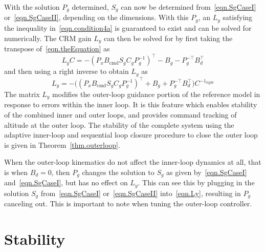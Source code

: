 With the solution $P_{g}$ determined, $S_{g}$ can now be determined from\ \eqref{eqn.SgCaseI} or\ \eqref{eqn.SgCaseII}, depending on the dimensions.
With this $P_{g}$, an $L_{g}$ satisfying the inequality in\ \eqref{eqn.condition4a} is guaranteed to exist and can be solved for numerically.
The CRM gain $L_{y}$ can then be solved for by first taking the transpose of\ \eqref{eqn.theEquation} as
\begin{equation*}
  L_{y}C=
  - (P_{x}B_{\text{cmd}}S_{g}C_{g}P_{g}^{-1})^{\top} - B_{g} - P_{g}^{-\top}B_{d}^{\top}
\end{equation*}
and then using a right inverse to obtain $L_{y}$ as
\begin{equation}
  \label{eqn.Ly}
  L_{y}=
  -\bigr((P_{x}B_{\text{cmd}}S_{g}C_{g}P_{g}^{-1})^{\top} + B_{g} + P_{g}^{-\top}B_{d}^{\top}\bigr)C^{-1_{\text{right}}}
\end{equation}
The matrix $L_{y}$ modifies the outer-loop guidance portion of the reference model in response to errors within the inner loop.
It is this feature which enables stability of the combined inner and outer loops, and provides command tracking of altitude at the outer loop.
The stability of the complete system using the adaptive inner-loop and sequential loop closure procedure to close the outer loop is given in Theorem~\ref{thm.outerloop}.

\begin{rem-dan}
  When the outer-loop kinematics do not affect the inner-loop dynamics at all, that is when $B_{d}=0$, then $P_{g}$ changes the solution to $S_{g}$ as given by\ \eqref{eqn.SgCaseI} and\ \eqref{eqn.SgCaseI}, but has no effect on $L_{y}$.
  This can see this by plugging in the solution $S_{g}$ from\ \eqref{eqn.SgCaseI} or\ \eqref{eqn.SgCaseII} into\ \eqref{eqn.Ly}, resulting in $P_{g}$ canceling out.
  This is important to note when tuning the outer-loop controller.
\end{rem-dan}

\section{Stability}

